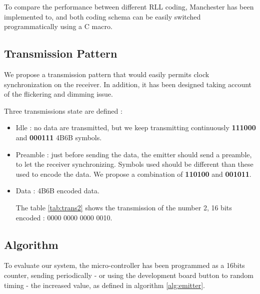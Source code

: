 To compare the performance between different RLL coding, Manchester has been implemented to, and both coding schema can be easily switched programmatically using a C macro.

\subsection{Transmission Pattern} \label{frame}

We propose a transmission pattern that would easily permits clock synchronization on the receiver. In addition, it has been designed taking account of the flickering and dimming issue.

Three transmissions state are defined : 
\begin{itemize}
\item Idle : no data are transmitted, but we keep transmitting continuously \textbf{111000} and \textbf{000111} 4B6B symbols.
\item Preamble : just before sending the data, the emitter should send a preamble, to let the receiver synchronizing. Symbols used should be different than these used to encode the data. We propose a combination of \textbf{110100} and \textbf{001011}.
\item Data : 4B6B encoded data.

The table \ref{tab:trans2} shows the transmission of the number 2, 16 bits encoded : 0000 0000 0000 0010.

\begin{table}[htbp]
  \caption{A transmission example : 2 16 bits}
  \begin{center}
  \end{center}

  \label{tab:trans2}
\end{table}


\end{itemize}
\subsection{Algorithm}
To evaluate our system, the micro-controller has been programmed as a 16bits counter, sending periodically - or using the development board button to random timing - the increased value, as defined in algorithm \ref{alg:emitter}.

